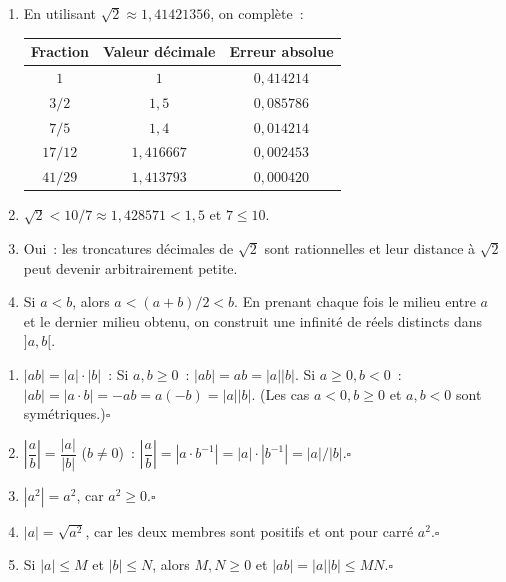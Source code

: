 
\begin{enumerate}
  \item En utilisant $\sqrt2\approx1{,}41421356$, on compl\`ete~:
        \begin{center}
        \begin{tabular}{|c|c|c|}\hline
        \rowcolor{BN!10} Fraction & Valeur d\'ecimale & Erreur absolue \\ \hline
        $1$ & $1$ & $0{,}414214$ \\
        $3/2$ & $1{,}5$ & $0{,}085786$ \\
        $7/5$ & $1{,}4$ & $0{,}014214$ \\
        $17/12$ & $1{,}416667$ & $0{,}002453$ \\
        $41/29$ & $1{,}413793$ & $0{,}000420$ \\ \hline
        \end{tabular}
        \end{center}
  \item $\sqrt2<10/7\approx1{,}428571<1{,}5$ et $7\leq10$.
  \item Oui~: les troncatures d\'ecimales de $\sqrt2$ sont rationnelles
        et leur distance \`a $\sqrt2$ peut devenir arbitrairement petite.
  \item Si $a<b$, alors $a<(a+b)/2<b$. En prenant chaque fois le milieu
        entre $a$ et le dernier milieu obtenu, on construit une infinit\'e
        de r\'eels distincts dans $]a,b[$.
\end{enumerate}


\begin{enumerate}
  \item $|ab|=|a|\cdot|b|$~:
        Si $a,b\geq0$~: $|ab|=ab=|a||b|$.\quad
        Si $a\geq0,b<0$~: $|ab|=|a\cdot b|=-ab=a(-b)=|a||b|$.
        (Les cas $a<0,b\geq0$ et $a,b<0$ sont sym\'etriques.)\hfill$\square$
  \item $\left|\dfrac{a}{b}\right|=\dfrac{|a|}{|b|}$ ($b\ne0$)~:
        $\left|\dfrac{a}{b}\right|=|a\cdot b^{-1}|=|a|\cdot|b^{-1}|=|a|/|b|$.\hfill$\square$
  \item $|a^2|=a^2$, car $a^2\geq0$.\hfill$\square$
  \item $|a|=\sqrt{a^2}$, car les deux membres sont positifs
        et ont pour carr\'e $a^2$.\hfill$\square$
  \item Si $|a|\leq M$ et $|b|\leq N$, alors $M,N\geq0$ et
        $|ab|=|a||b|\leq MN$.\hfill$\square$
\end{enumerate}

